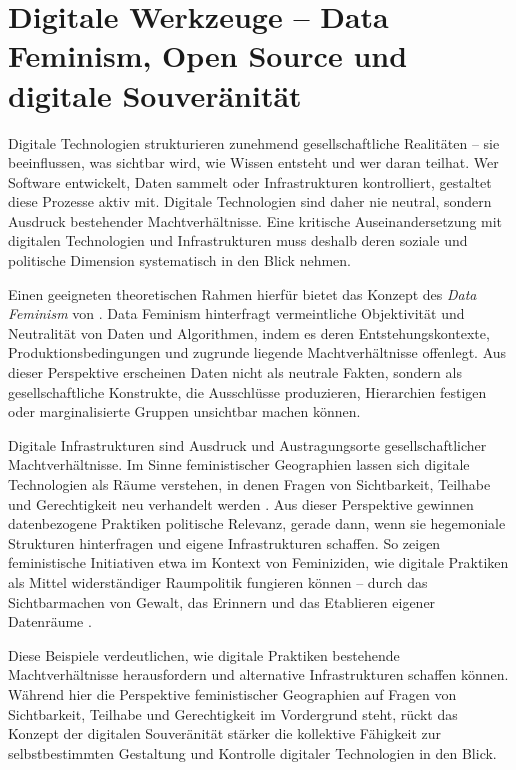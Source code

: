 \section{Digitale Werkzeuge -- Data Feminism, Open Source und digitale Souveränität}
\label{sec:datafeminism}

Digitale Technologien strukturieren zunehmend gesellschaftliche Realitäten -- sie beeinflussen, was sichtbar wird, wie Wissen entsteht und wer daran teilhat. Wer Software entwickelt, Daten sammelt oder Infrastrukturen kontrolliert, gestaltet diese Prozesse aktiv mit. Digitale Technologien sind daher nie neutral, sondern Ausdruck bestehender Machtverhältnisse. Eine kritische Auseinandersetzung mit digitalen Technologien und Infrastrukturen muss deshalb deren soziale und politische Dimension systematisch in den Blick nehmen.

Einen geeigneten theoretischen Rahmen hierfür bietet das Konzept des \textit{Data Feminism} von \textcite{dignazioDataFeminism2020}. Data Feminism hinterfragt vermeintliche Objektivität und Neutralität von Daten und Algorithmen, indem es deren Entstehungskontexte, Produktionsbedingungen und zugrunde liegende Machtverhältnisse offenlegt. Aus dieser Perspektive erscheinen Daten nicht als neutrale Fakten, sondern als gesellschaftliche Konstrukte, die Ausschlüsse produzieren, Hierarchien festigen oder marginalisierte Gruppen unsichtbar machen können.

Digitale Infrastrukturen sind Ausdruck und Austragungsorte gesellschaftlicher Machtverhältnisse. Im Sinne feministischer Geographien lassen sich digitale Technologien als Räume verstehen, in denen Fragen von Sichtbarkeit, Teilhabe und Gerechtigkeit neu verhandelt werden \parencite{elwoodFeministDigitalGeographies2018}. Aus dieser Perspektive gewinnen datenbezogene Praktiken politische Relevanz, gerade dann, wenn sie hegemoniale Strukturen hinterfragen und eigene Infrastrukturen schaffen. So zeigen feministische Initiativen etwa im Kontext von Feminiziden, wie digitale Praktiken als Mittel widerständiger Raumpolitik fungieren können -- durch das Sichtbarmachen von Gewalt, das Erinnern und das Etablieren eigener Datenräume \parencite{dignazioGeographiesMissingData2024}.

Diese Beispiele verdeutlichen, wie digitale Praktiken bestehende Machtverhältnisse herausfordern und alternative Infrastrukturen schaffen können. Während hier die Perspektive feministischer Geographien auf Fragen von Sichtbarkeit, Teilhabe und Gerechtigkeit im Vordergrund steht, rückt das Konzept der digitalen Souveränität stärker die kollektive Fähigkeit zur selbstbestimmten Gestaltung und Kontrolle digitaler Technologien in den Blick.

